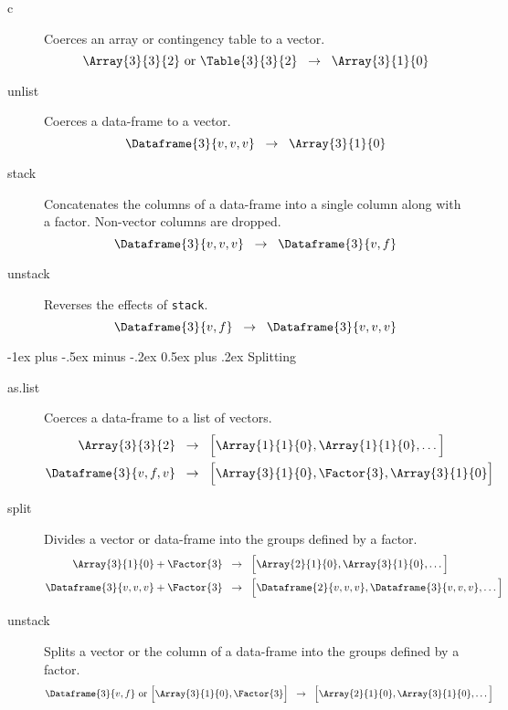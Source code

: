 \documentclass[a4paper,landscape]{article}
\makeatletter
\renewcommand{\section}{\@startsection{section}{1}{0mm}%
                                {-1ex plus -.5ex minus -.2ex}%
                                {0.5ex plus .2ex}%
                                {\normalfont\large\bfseries}}
\newcommand{\Maps}{\;\;\rightarrow \;\;}
\makeatother
\begin{document}
\begin{multicols*}{3}
\begin{description}
\item[c] Coerces an array or contingency table to a vector.
\[
  \Array{3}{3}{2}\ \text{or}\ \Table{3}{3}{2} \Maps \Array{3}{1}{0}
\]

\item[unlist] Coerces a data-frame to a vector.
  \[ \Dataframe{3}{v,v,v} \Maps \Array{3}{1}{0} \]

\item[stack] Concatenates the columns of a data-frame into a single column
  along with a factor.  Non-vector columns are dropped.
  \[ \Dataframe{3}{v,v,v} \Maps \Dataframe{3}{v,f} \]

\item[unstack] Reverses the effects of \verb!stack!.
  \[ \Dataframe{3}{v,f} \Maps \Dataframe{3}{v,v,v} \]

\end{description}

\section{Splitting}

\begin{description}

\item[as.list] Coerces a data-frame to a list of vectors.
  \begin{align*}
    \Array{3}{3}{2} &\Maps \List{\Array{1}{1}{0},\Array{1}{1}{0},\dots} \\
    \Dataframe{3}{v,f,v}
    &\Maps \List{\Array{3}{1}{0},\Factor{3},\Array{3}{1}{0}}
  \end{align*}

\item[split] Divides a vector or data-frame into the groups defined by a
  factor.
  \begin{align*}
    \Array{3}{1}{0} + \Factor{3}
    &\Maps \List{\Array{2}{1}{0},\Array{3}{1}{0},\dots} \\
    \Dataframe{3}{v,v,v} + \Factor{3}
    &\Maps \List{\Dataframe{2}{v,v,v},\Dataframe{3}{v,v,v},\dots}
  \end{align*}

\item[unstack] Splits a vector or the column of a data-frame into the groups
  defined by a factor.
  \begin{align*}
    \Dataframe{3}{v,f}\ \text{or}\ \List{\Array{3}{1}{0},\Factor{3}}
    &\Maps \List{\Array{2}{1}{0},\Array{3}{1}{0},\dots}
  \end{align*}


\end{description}
\end{multicols*}
\end{document}
